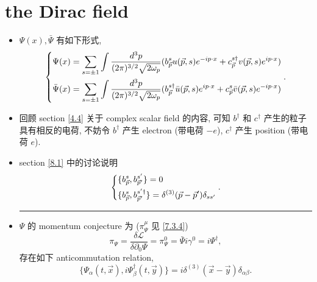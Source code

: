 \section{the Dirac field}
\begin{itemize}
	\item $\Psi(x), \bar{\Psi}$ 有如下形式,
	\begin{equation} \label{8.3.1}
		\begin{dcases}
			\Psi(x) = \sum_{s = \pm 1} \int \frac{d^3 p}{(2 \pi)^{3 / 2} \sqrt{2 \omega_p}} (b^s_{\vec{p}} u(\vec{p}, s) e^{- i p \cdot x} + c^{s \dag}_{\vec{p}} v(\vec{p}, s) e^{i p \cdot x}) \\
			\bar{\Psi}(x) = \sum_{s = \pm 1} \int \frac{d^3 p}{(2 \pi)^{3 / 2} \sqrt{2 \omega_p}} (b^{s \dag}_{\vec{p}} \bar{u}(\vec{p}, s) e^{i p \cdot x} + c^s_{\vec{p}} \bar{v}(\vec{p}, s) e^{- i p \cdot x})
		\end{dcases}.
	\end{equation}
	
	\item 回顾 section \ref{4.4} 关于 complex scalar field 的内容, 可知 $b^\dag$ 和 $c^\dag$ 产生的粒子具有相反的电荷, 不妨令 $b^\dag$ 产生 electron (带电荷 $- e$), $c^\dag$ 产生 position (带电荷 $e$).
	
	\item section \ref{8.1} 中的讨论说明
	\begin{equation} \label{8.3.2}
		\begin{dcases}
			\{b^s_{\vec{p}}, b^{s'}_{\vec{p}'}\} = 0 \\
			\{b^s_{\vec{p}}, b^{s' \dag}_{\vec{p}'}\} = \delta^{(3)}(\vec{p} - \vec{p}') \delta_{s s'}
		\end{dcases}.
	\end{equation}
	
	\noindent\rule[0.5ex]{\linewidth}{0.5pt} %
	
	\item $\Psi$ 的 momentum conjecture 为 ($\pi_\Psi^\mu$ 见 \eqref{7.3.4})
	\begin{equation}
		\pi_\Psi = \frac{\delta \mathcal{L}}{\delta \partial_0 \Psi} = \pi_\Psi^0 = \bar{\Psi} i \gamma^0 = i \Psi^\dag,
	\end{equation}
	存在如下 anticommutation relation,
	\begin{equation}
		\{\Psi_\alpha(t, \vec{x}), i \Psi^\dag_\beta(t, \vec{y})\} = i \delta^{(3)}(\vec{x} - \vec{y}) \delta_{\alpha \beta}.
	\end{equation}
	

\end{itemize}
